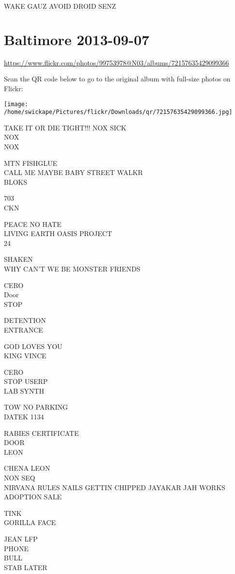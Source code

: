 \documentclass[10pt,letterpaper]{article}
\begin{document}
WAKE GAUZ AVOID DROID SENZ


\section*{Baltimore 2013-09-07}

\url{https://www.flickr.com/photos/99753978@N03/albums/72157635429099366}

Scan the QR code below to go to the original album with full-size photos on Flickr:

\texttt{[image: /home/swickape/Pictures/flickr/Downloads/qr/72157635429099366.jpg]}


TAKE IT OR DIE TIGHT!!! NOX SICK\\
NOX\\
NOX

MTN FISHGLUE\\
CALL ME MAYBE BABY STREET WALKR\\
BLOKS

703\\
CKN

PEACE NO HATE\\
LIVING EARTH OASIS PROJECT\\
24

SHAKEN\\
WHY CAN'T WE BE MONSTER FRIENDS

CERO\\
Door\\
STOP

DETENTION\\
ENTRANCE

GOD LOVES YOU\\
KING VINCE

CERO\\
STOP USERP\\
LAB SYNTH

TOW NO PARKING\\
DATEK 1134

RABIES CERTIFICATE\\
DOOR\\
LEON

CHENA LEON\\
NON SEQ\\
NIRVANA RULES NAILS GETTIN CHIPPED JAYAKAR JAH WORKS\\
ADOPTION SALE

TINK\\
GORILLA FACE

JEAN LFP\\
PHONE\\
BULL\\
STAB LATER
\end{document}

